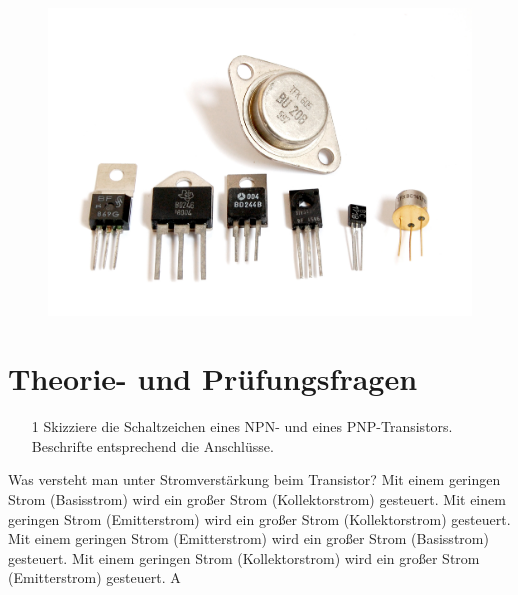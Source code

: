 

\begin{figure}
 \vspace{-6cm}
  \includegraphics[scale=0.4]{Transistor/Bilder/Transistors-white.jpg}
 \vspace{-6cm}
\end{figure}

\section*{Theorie- und Prüfungsfragen}

\begin{enumerate}
\itemsep1pt\parskip0pt
\item[1] Skizziere die Schaltzeichen eines NPN- und eines PNP-Transistors. Beschrifte  entsprechend die Anschlüsse.
\end{enumerate}


{Was versteht man unter Stromverstärkung beim Transistor?}%
{Mit einem geringen Strom (Basisstrom) wird ein großer Strom (Kollektorstrom) gesteuert.}%
{Mit einem geringen Strom (Emitterstrom) wird ein großer Strom (Kollektorstrom) gesteuert.}%
{Mit einem geringen Strom (Emitterstrom) wird ein großer Strom (Basisstrom) gesteuert.}%
{Mit einem geringen Strom (Kollektorstrom) wird ein großer Strom (Emitterstrom) gesteuert.}%
{A}%

